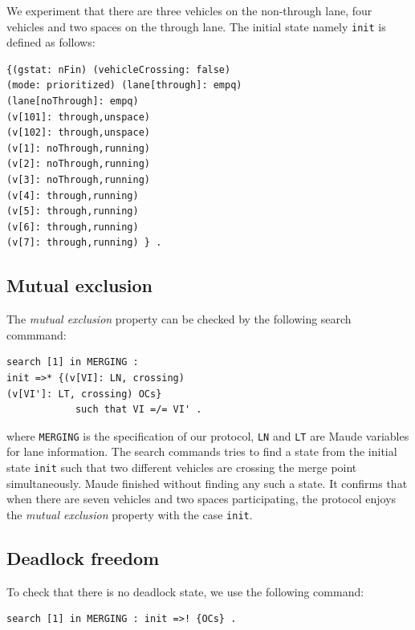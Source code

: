 \documentclass[10pt, conference, compsocconf]{IEEEtran}
\begin{document}
We experiment that there are three vehicles on the non-through lane,
four vehicles and two spaces on the through lane.
The initial state namely \verb!init! is defined as follows:
\begin{small}
\begin{verbatim}
{(gstat: nFin) (vehicleCrossing: false) 
(mode: prioritized) (lane[through]: empq) 
(lane[noThrough]: empq) 
(v[101]: through,unspace) 
(v[102]: through,unspace)
(v[1]: noThrough,running) 
(v[2]: noThrough,running) 
(v[3]: noThrough,running)
(v[4]: through,running) 
(v[5]: through,running) 
(v[6]: through,running) 
(v[7]: through,running) } .
\end{verbatim}
\end{small}

\subsection{Mutual exclusion}

The \textit{mutual exclusion} property can be checked by the following search commmand:

\begin{small}
\begin{verbatim}
search [1] in MERGING : 
init =>* {(v[VI]: LN, crossing) 
(v[VI']: LT, crossing) OCs} 
            such that VI =/= VI' .
\end{verbatim}
\end{small}

\noindent
where \verb!MERGING! is the specification of our protocol, \verb!LN! and \verb!LT!
are Maude variables for lane information.
The search commands tries to find a state from the initial state \verb!init! 
such that two different vehicles are crossing the merge point simultaneously.
Maude finished without finding any such a state.
It confirms that when there are seven vehicles and two spaces participating, the protocol 
enjoys the \textit{mutual exclusion} property with the case \verb!init!.

\subsection{Deadlock freedom}
To check that there is no deadlock state, we use the following command:

\begin{small}
\begin{verbatim}
search [1] in MERGING : init =>! {OCs} .
\end{verbatim}
\end{small}
\end{document}
